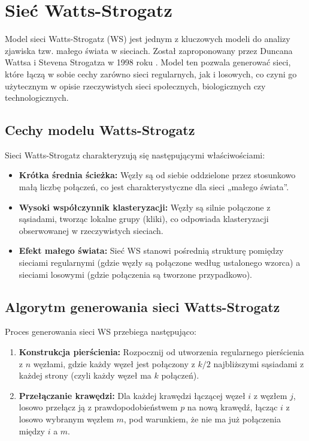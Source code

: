 \section{Sieć Watts-Strogatz}
Model sieci Watts-Strogatz (WS) jest jednym z kluczowych modeli do analizy zjawiska tzw. małego świata w sieciach.
Został zaproponowany przez Duncana Wattsa i Stevena Strogatza w 1998 roku \cite{Watts1998}.
Model ten pozwala generować sieci, które łączą w sobie cechy zarówno sieci regularnych, jak i losowych, co czyni go użytecznym w opisie rzeczywistych sieci społecznych, biologicznych czy technologicznych.

\subsection{Cechy modelu Watts-Strogatz}
Sieci Watts-Strogatz charakteryzują się następującymi właściwościami:
\begin{itemize}
    \item \textbf{Krótka średnia ścieżka:} Węzły są od siebie oddzielone przez stosunkowo małą liczbę połączeń, co jest charakterystyczne dla sieci „małego świata”.
    \item \textbf{Wysoki współczynnik klasteryzacji:} Węzły są silnie połączone z sąsiadami, tworząc lokalne grupy (kliki), co odpowiada klasteryzacji obserwowanej w rzeczywistych sieciach.
    \item \textbf{Efekt małego świata:} Sieć WS stanowi pośrednią strukturę pomiędzy sieciami regularnymi (gdzie węzły są połączone według ustalonego wzorca) a sieciami losowymi (gdzie połączenia są tworzone przypadkowo).
\end{itemize}

\subsection{Algorytm generowania sieci Watts-Strogatz}
Proces generowania sieci WS przebiega następująco:

\begin{enumerate}
    \item \textbf{Konstrukcja pierścienia:} Rozpocznij od utworzenia regularnego pierścienia z $n$ węzłami,
          gdzie każdy węzeł jest połączony z $k/2$ najbliższymi sąsiadami z każdej strony (czyli każdy węzeł ma $k$ połączeń).
    \item \textbf{Przełączanie krawędzi:} Dla każdej krawędzi łączącej węzeł $i$ z węzłem $j$, losowo przełącz ją z prawdopodobieństwem $p$ na nową krawędź,
          łącząc $i$ z losowo wybranym węzłem $m$, pod warunkiem, że nie ma już połączenia między $i$ a $m$.
\end{enumerate}

